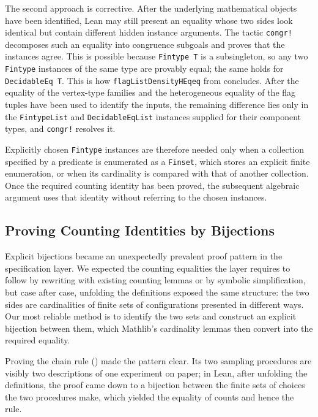 \documentclass[acmsmall,screen=true,acmthm=false]{acmart}
\DeclareRobustCommand{\lean}[1]{{\def\_{\textunderscore\allowbreak}\texttt{#1}}}
\begin{document}
The second approach is corrective.  After the underlying mathematical objects
have been identified, Lean may still present an equality whose two sides look
identical but contain different hidden instance arguments.  The tactic
\lean{congr!} decomposes such an equality into congruence subgoals and proves
that the instances agree.  This is possible because \lean{Fintype T} is a
subsingleton, so any two \lean{Fintype} instances of the same type are provably
equal; the same holds for \lean{DecidableEq T}.  This is how
\lean{flagListDensity\allowbreak\_HEq\allowbreak\_eq} from
 concludes.  After the equality of the
vertex-type families and the heterogeneous equality of the flag tuples have
been used to identify the inputs, the remaining difference lies only in the
\lean{FintypeList} and \lean{DecidableEqList} instances supplied for their
component types, and \lean{congr!} resolves it.

Explicitly chosen \lean{Fintype} instances are therefore needed only when a
collection specified by a predicate is enumerated as a \lean{Finset}, which
stores an explicit finite enumeration, or when its cardinality is compared
with that of another collection.  Once the required counting identity has
been proved, the subsequent algebraic argument uses that identity without
referring to the chosen instances.

\subsection{Proving Counting Identities by Bijections}
\label{sec:proof-style}

Explicit bijections became an unexpectedly prevalent proof pattern in the
specification layer.  We expected the counting equalities the layer requires
to follow by rewriting with existing counting lemmas or by symbolic
simplification, but case after case, unfolding the definitions exposed the
same structure: the two sides are cardinalities of finite sets of
configurations presented in different ways.  Our most reliable method is to
identify the two sets and construct an explicit bijection between them, which
Mathlib's cardinality lemmas then convert into the required equality.

Proving the chain rule () made the pattern
clear.  Its two sampling procedures are visibly two descriptions of one
experiment on paper; in Lean, after unfolding the definitions, the proof came
down to a bijection between the finite sets of choices the two procedures
make, which yielded the equality of counts and hence the rule.
\end{document}
